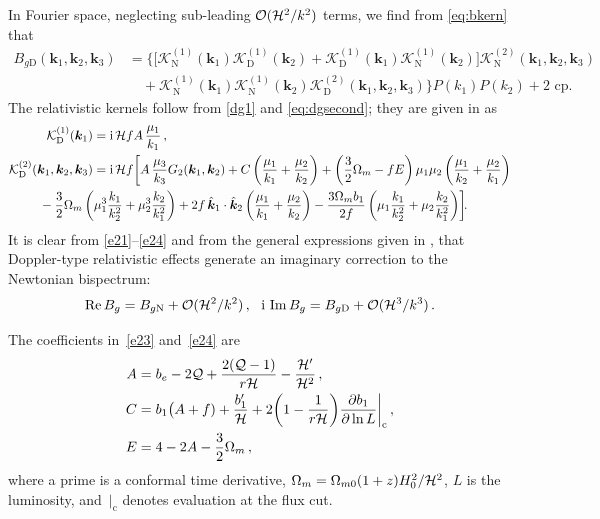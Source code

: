 In Fourier space, 
neglecting sub-leading $ \mathcal{O}(\mathcal{H}^2/k^2)$ terms, we find from \eqref{eq:bkern} that
\begin{align}
 B_{g\mathrm{D}}(\bm{k}_{1},\bm{k}_{2},\bm{k}_{3}) &=  \bigg\{\bigg[\mathcal{K}^{(1)}_{\mathrm{N}}(\bm{k}_{1})\mathcal{K}^{(1)}_{\mathrm{D}}(\bm{k}_{2}) + \mathcal{K}^{(1)}_{\mathrm{D}}(\bm{k}_{1})\mathcal{K}^{(1)}_{\mathrm{N}}(\bm{k}_{2})\bigg]\mathcal{K}^{(2)}_{\mathrm{N}}(\bm{k}_{1},\bm{k}_{2},\bm{k}_{3}) 
\nonumber \\&  \quad 
+\mathcal{K}^{(1)}_{\mathrm{N}}(\bm{k}_{1})\mathcal{K}^{(1)}_{\mathrm{N}}(\bm{k}_{2})\mathcal{K}^{(2)}_{\mathrm{D}}(\bm{k}_{1},\bm{k}_{2},\bm{k}_{3})\bigg\}P(k_{1})P(k_{2})+\text{2 cp}. \label{e21}
\end{align}
The relativistic kernels follow from \eqref{dg1} and \eqref{eq:dgsecond}; they are given in \cite{Clarkson:2018dwn} as
\begin{align}
\mathcal{K}^{(1)}_{\mathrm{D}}(\bm{k}_{1}) &= \mathrm{i}\,\cH f A\,\frac{\mu_{1}}{k_{1}}\,, \label{e23} \\
\mathcal{K}^{(2)}_{\mathrm{D}}(\bm{k}_{1},\bm{k}_{2},\bm{k}_{3}) &= \mathrm{i}\,\cH f \bigg[
A\,\frac{\mu_{3}}{k_{3}}G_{2}(\bm{k}_{1},\bm{k}_{2})
+C\left(\frac{\mu_{1}}{k_{1}} + \frac{\mu_{2}}{k_{2}}\right)
 +\left(\frac{3}{2}\Omega_{m}-fE\right)\mu_{1}\mu_{2}\left(\frac{\mu_{1}}{k_{2}}+\frac{\mu_{2}}{k_{1}}\right)
\nonumber \\
&\hspace*{-1.5cm}  
{} -\frac{3}{2}\Omega_{m}\left(\mu_{1}^{3}\frac{k_{1}}{k_{2}^{2}} + \mu_{2}^{3}\frac{k_{2}}{k_{1}^{2}}\right)
+2f\,  {\hat{\bm{k}}_{1} \cdot \hat{\bm{k}}_2}\left(\frac{\mu_{1}}{k_{1}} + \frac{\mu_{2}}{k_{2}}\right) 
 -\frac{3\Omega_{m}b_1}{2f}\left(\mu_{1}\frac{k_{1}}{k_{2}^{2}} + \mu_{2}\frac{k_{2}}{k_{1}^{2}}\right)\!  \bigg]\! .~~~ \label{e24}
\end{align}
It is clear from \eqref{e21}--\eqref{e24} and from the general expressions given in {\cite{Umeh:2016nuh,Jolicoeur:2017nyt}}, that Doppler-type relativistic effects generate an imaginary correction to the Newtonian bispectrum: 
\begin{equation}
{{\mathrm{Re}}\, B_g =B_{g\mathrm{N}} + \mathcal{O}(\mathcal{H}^2/k^2)\,,~~ {\mathrm{i\,}}\, {\mathrm{Im}}\, B_g = B_{g\mathrm{D}}+ \mathcal{O}(\mathcal{H}^3/k^3)}\,. \label{bgnd}
\end{equation}

The  coefficients in~\eqref{e23} and~\eqref{e24} are~\cite{Clarkson:2018dwn}
\begin{align}
A &= b_{e} - 2\mathcal{Q} + \frac{2(\mathcal{Q}-1)}{{r} \mathcal{H}}
 - \frac{\mathcal{H}'}{\mathcal{H}^{2}} \label{e25} \,, \\
C &= b_{1}\big(A+f) + \frac{b_1'}{\mathcal{H}} + 2\bigg(1-\frac{1}{{r} \mathcal{H}}\bigg){\frac{\partial b_1}{\partial \ln{L}}\bigg|_{\mathrm{c}}} \label{e26}\,, \\
E &= 4-2A-\frac{3}{2}\Omega_{m} \label{e27} \,,
\end{align}
where a prime is a conformal time derivative, $\Omega_m=\Omega_{m0}(1+z)H_0^2/\mathcal{H}^2$,  $L$ is the  luminosity, and $\,|_{\mathrm{c}}$ denotes evaluation at the flux cut. 

